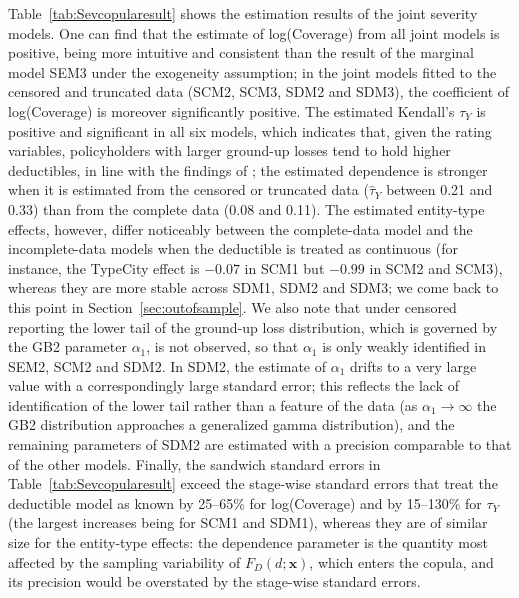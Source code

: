 \documentclass[11pt]{article}
\newcommand{\rev}[1]{{\color{blue}#1}}
\begin{document}
\rev{Table~\ref{tab:Sevcopularesult} shows the estimation results of the joint severity models. One can find that the estimate of log(Coverage) from all joint models is positive, being more intuitive and consistent than the result of the marginal model SEM3 under the exogeneity assumption; in the joint models fitted to the censored and truncated data (SCM2, SCM3, SDM2 and SDM3), the coefficient of log(Coverage) is moreover significantly positive. The estimated Kendall's $\tau_Y$ is positive and significant in all six models, which indicates that, given the rating variables, policyholders with larger ground-up losses tend to hold higher deductibles, in line with the findings of \citet{shi2022copula}; the estimated dependence is stronger when it is estimated from the censored or truncated data ($\hat{\tau}_Y$ between 0.21 and 0.33) than from the complete data (0.08 and 0.11). The estimated entity-type effects, however, differ noticeably between the complete-data model and the incomplete-data models when the deductible is treated as continuous (for instance, the TypeCity effect is $-0.07$ in SCM1 but $-0.99$ in SCM2 and SCM3), whereas they are more stable across SDM1, SDM2 and SDM3; we come back to this point in Section~\ref{sec:outofsample}. We also note that under censored reporting the lower tail of the ground-up loss distribution, which is governed by the GB2 parameter $\alpha_1$, is not observed, so that $\alpha_1$ is only weakly identified in SEM2, SCM2 and SDM2. In SDM2, the estimate of $\alpha_1$ drifts to a very large value with a correspondingly large standard error; this reflects the lack of identification of the lower tail rather than a feature of the data (as $\alpha_1\to\infty$ the GB2 distribution approaches a generalized gamma distribution), and the remaining parameters of SDM2 are estimated with a precision comparable to that of the other models. Finally, the sandwich standard errors in Table~\ref{tab:Sevcopularesult} exceed the stage-wise standard errors that treat the deductible model as known by 25--65\% for log(Coverage) and by 15--130\% for $\tau_Y$ (the largest increases being for SCM1 and SDM1), whereas they are of similar size for the entity-type effects: the dependence parameter is the quantity most affected by the sampling variability of $F_D(d;\bm{x})$, which enters the copula, and its precision would be overstated by the stage-wise standard errors.}
\end{document}
